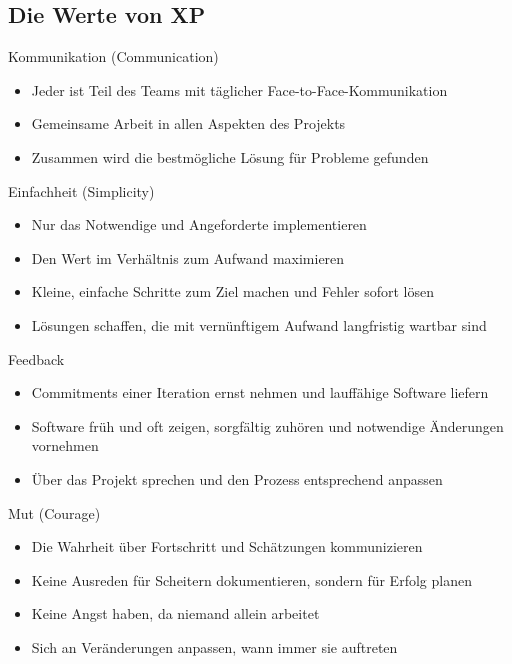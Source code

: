 \subsection{Die Werte von XP}

\begin{concept}{Kommunikation (Communication)}\\
    \begin{itemize}
        \item Jeder ist Teil des Teams mit täglicher Face-to-Face-Kommunikation
        \item Gemeinsame Arbeit in allen Aspekten des Projekts
        \item Zusammen wird die bestmögliche Lösung für Probleme gefunden
    \end{itemize}
\end{concept}

\begin{concept}{Einfachheit (Simplicity)}\\
    \begin{itemize}
        \item Nur das Notwendige und Angeforderte implementieren
        \item Den Wert im Verhältnis zum Aufwand maximieren
        \item Kleine, einfache Schritte zum Ziel machen und Fehler sofort lösen
        \item Lösungen schaffen, die mit vernünftigem Aufwand langfristig wartbar sind
    \end{itemize}
\end{concept}

\begin{concept}{Feedback}\\
    \begin{itemize}
        \item Commitments einer Iteration ernst nehmen und lauffähige Software liefern
        \item Software früh und oft zeigen, sorgfältig zuhören und notwendige Änderungen vornehmen
        \item Über das Projekt sprechen und den Prozess entsprechend anpassen
    \end{itemize}
\end{concept}

\begin{concept}{Mut (Courage)}\\
    \begin{itemize}
        \item Die Wahrheit über Fortschritt und Schätzungen kommunizieren
        \item Keine Ausreden für Scheitern dokumentieren, sondern für Erfolg planen
        \item Keine Angst haben, da niemand allein arbeitet
        \item Sich an Veränderungen anpassen, wann immer sie auftreten
    \end{itemize}
\end{concept}

